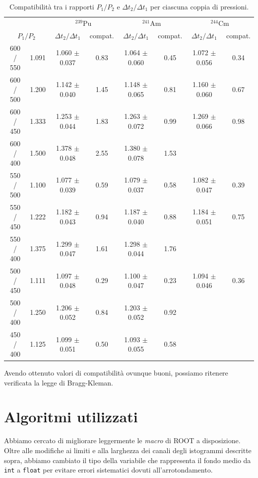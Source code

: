 \documentclass[italian,a4paper]{article}
\newcommand{\D}{\Delta}
\newcommand{\Am}{$^{241}$Am}
\newcommand{\Cm}{$^{244}$Cm}
\newcommand{\Pu}{$^{239}$Pu}
\begin{document}
\begin{table}[h!]\centering
\renewcommand{\arraystretch}{1.1}
\begin{tabular}{c@{ = }c|*2c|*2c|*2c}
\multicolumn{2}{c}{}	&	\multicolumn{2}{|c|}{\Pu}&	\multicolumn{2}{c|}{\Am}&	\multicolumn{2}{c}{\Cm}\\
\multicolumn{2}{c|}{$P_1 / P_2$}&	$\D t_2 / \D t_1$&	compat.&	$\D t_2 / \D t_1$&	compat.&	$\D t_2 / \D t_1$&	compat.\\\hline
600 / 550& 1.091&      	1.060 $\pm$ 0.037&     0.83&	1.064 $\pm$ 0.060&     	0.45&	1.072 $\pm$ 0.056&     0.34\\
600 / 500& 1.200&      	1.142 $\pm$ 0.040&     1.45&	1.148 $\pm$ 0.065&     	0.81&	1.160 $\pm$ 0.060&     0.67\\
600 / 450& 1.333&      	1.253 $\pm$ 0.044&     1.83&	1.263 $\pm$ 0.072&     	0.99&	1.269 $\pm$ 0.066&     0.98\\
600 / 400& 1.500&      	1.378 $\pm$ 0.048&     2.55&	1.380 $\pm$ 0.078&     1.53& 	& \\
550 / 500& 1.100&      	1.077 $\pm$ 0.039&     0.59&	1.079 $\pm$ 0.037&    	0.58&	1.082 $\pm$ 0.047&     0.39\\
550 / 450& 1.222&      	1.182 $\pm$ 0.043&     0.94&	1.187 $\pm$ 0.040&     	0.88&	1.184 $\pm$ 0.051&     0.75\\
550 / 400& 1.375&      	1.299 $\pm$ 0.047&     1.61&	1.298 $\pm$ 0.044&     1.76&	& \\
500 / 450& 1.111&      	1.097 $\pm$ 0.048&     0.29&	1.100 $\pm$ 0.047&     	0.23&	1.094 $\pm$ 0.046&     0.36\\
500 / 400& 1.250&      	1.206 $\pm$ 0.052&     0.84&	1.203 $\pm$ 0.052&     0.92&	& \\
450 / 400& 1.125&     	1.099 $\pm$ 0.051&     0.50&	1.093 $\pm$ 0.055&     0.58&	& \\
\end{tabular}
\caption{Compatibilit\`a tra i rapporti $P_1/P_2$ e $\D t_2/\D t_1$ per ciascuna coppia di pressioni.}
\end{table} 
Avendo ottenuto valori di compatibilit\`a ovunque buoni, possiamo ritenere verificata la legge di Bragg-Kleman.
\section{Algoritmi utilizzati}\label{macro}
Abbiamo cercato di migliorare leggermente le \emph{macro} di ROOT a
disposizione. Oltre alle modifiche ai limiti e alla larghezza dei canali
degli istogrammi descritte sopra, abbiamo cambiato il tipo della variabile
che rappresenta il fondo medio da \texttt{int} a \texttt{float} per evitare
errori sistematici dovuti all'arrotondamento.
\end{document}
